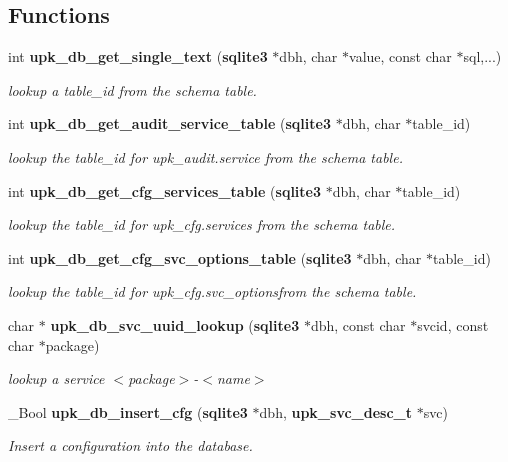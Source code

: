 \subsection*{Functions}
\begin{DoxyCompactItemize}
\item 
int {\bf upk\_\-db\_\-get\_\-single\_\-text} ({\bf sqlite3} $\ast$dbh, char $\ast$value, const char $\ast$sql,...)
\begin{DoxyCompactList}\small\item\em lookup a table\_\-id from the schema table. \end{DoxyCompactList}\item 
int {\bf upk\_\-db\_\-get\_\-audit\_\-service\_\-table} ({\bf sqlite3} $\ast$dbh, char $\ast$table\_\-id)
\begin{DoxyCompactList}\small\item\em lookup the table\_\-id for upk\_\-audit.service from the schema table. \end{DoxyCompactList}\item 
int {\bf upk\_\-db\_\-get\_\-cfg\_\-services\_\-table} ({\bf sqlite3} $\ast$dbh, char $\ast$table\_\-id)
\begin{DoxyCompactList}\small\item\em lookup the table\_\-id for upk\_\-cfg.services from the schema table. \end{DoxyCompactList}\item 
int {\bf upk\_\-db\_\-get\_\-cfg\_\-svc\_\-options\_\-table} ({\bf sqlite3} $\ast$dbh, char $\ast$table\_\-id)
\begin{DoxyCompactList}\small\item\em lookup the table\_\-id for upk\_\-cfg.svc\_\-optionsfrom the schema table. \end{DoxyCompactList}\item 
char $\ast$ {\bf upk\_\-db\_\-svc\_\-uuid\_\-lookup} ({\bf sqlite3} $\ast$dbh, const char $\ast$svcid, const char $\ast$package)
\begin{DoxyCompactList}\small\item\em lookup a service $<$package$>$-\/$<$name$>$ \end{DoxyCompactList}\item 
\_\-Bool {\bf upk\_\-db\_\-insert\_\-cfg} ({\bf sqlite3} $\ast$dbh, {\bf upk\_\-svc\_\-desc\_\-t} $\ast$svc)
\begin{DoxyCompactList}\small\item\em Insert a configuration into the database. \end{DoxyCompactList}\end{DoxyCompactItemize}
